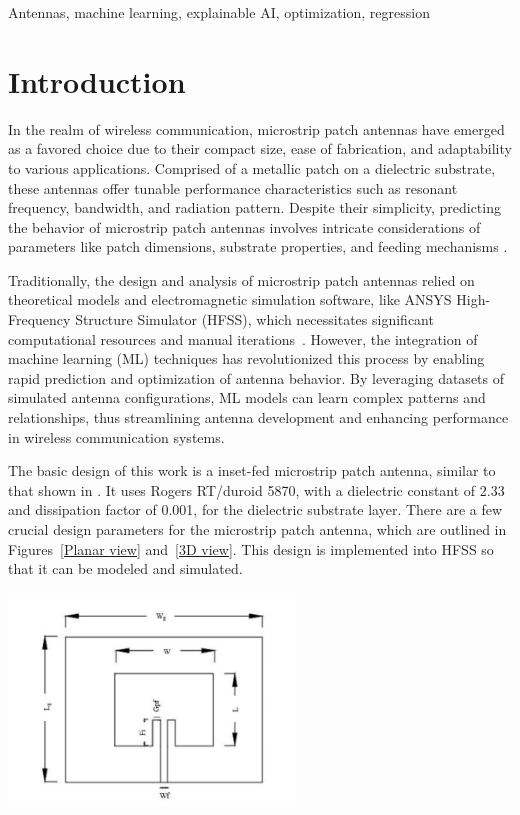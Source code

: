 \documentclass[conference]{IEEEtran}
\newenvironment{Figure}
    {\par\medskip\noindent\minipage{\linewidth}}
    {\endminipage\par\medskip}
\begin{document}
\begin{IEEEkeywords}
Antennas, machine learning, explainable AI, optimization, regression
\end{IEEEkeywords}


\section{Introduction}

In the realm of wireless communication, microstrip patch antennas have emerged as a favored choice due to their compact size, ease of fabrication, and adaptability to various applications. Comprised of a metallic patch on a dielectric substrate, these antennas offer tunable performance characteristics such as resonant frequency, bandwidth, and radiation pattern. Despite their simplicity, predicting the behavior of microstrip patch antennas involves intricate considerations of parameters like patch dimensions, substrate properties, and feeding mechanisms \cite{Patch_antennas}.

Traditionally, the design and analysis of microstrip patch antennas relied on theoretical models and electromagnetic simulation software, like ANSYS High-Frequency Structure Simulator (HFSS), which necessitates significant computational resources and manual iterations~\cite{john_antenna_2009,ranjan_design_2023,liu_efficient_2014}. However, the integration of machine learning (ML) techniques has revolutionized this process by enabling rapid prediction and optimization of antenna behavior. By leveraging datasets of simulated antenna configurations, ML models can learn complex patterns and relationships, thus streamlining antenna development and enhancing performance in wireless communication systems.

The basic design of this work is a inset-fed microstrip patch antenna, similar to that shown in \cite{inset_feed_pa}. It uses Rogers RT/duroid 5870, with a dielectric constant of 2.33 and dissipation factor of 0.001, for the dielectric substrate layer. There are a few crucial design parameters for the microstrip patch antenna, which are outlined in Figures~\ref{Planar view} and~\ref{3D view}. This design is implemented into HFSS so that it can be modeled and simulated. 

\begin{Figure}
    \centering
    \includegraphics[width=3in]{inset_fed patch antenna.png}
    \label{Planar view}
\end{Figure}
\end{document}
